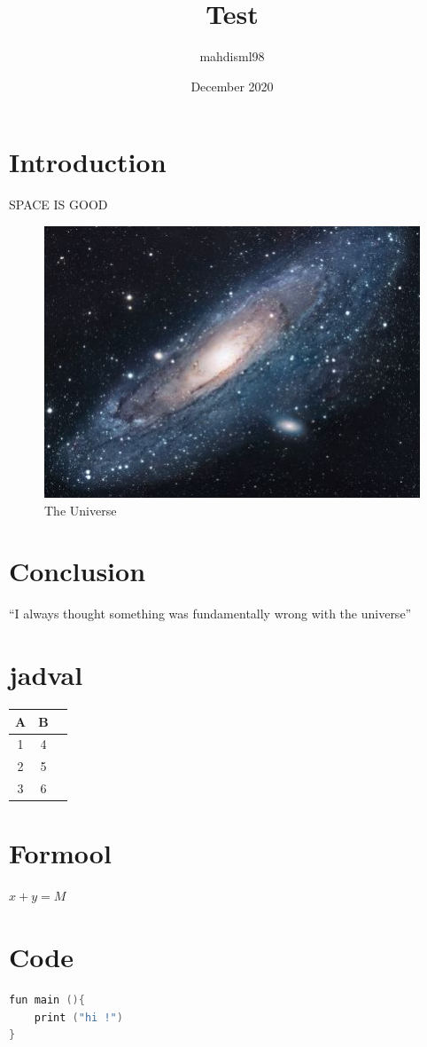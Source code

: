 \documentclass{article}
\title{Test}
\author{mahdisml98 }
\date{December 2020}
\begin{document}
\maketitle

\section{Introduction}
SPACE IS GOOD



\begin{figure}[h!]
\centering
\includegraphics[scale=1.7]{universe}
\caption{The Universe}
\label{fig:universe}
\end{figure}

\section{Conclusion}
``I always thought something was fundamentally wrong with the universe'' \citep{adams1995hitchhiker}

\section{jadval}
\begin{table}[h]
    \begin{center}
     \begin{tabular}{|c|c|c|}
       \hline
       \textbf{A} & \textbf{B} \\
       \hline
        1 & 4  \\
       \hline
       2 & 5  \\
       \hline
       3 & 6 \\
       \hline
     \end{tabular}
     \end{center}
\end{table}


\section{Formool}
\(x + y = M\)



\section{Code}
\begin{lstlisting}[language=C]
fun main (){
    print ("hi !")
}
\end{lstlisting}




\end{document}
